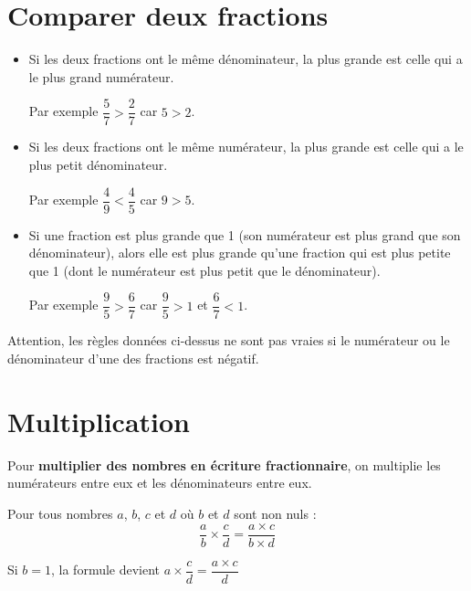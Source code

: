 \section{Comparer deux fractions}

\begin{aconnaitre}
\begin{itemize}
\item Si les deux fractions ont le même dénominateur, la plus grande est celle qui a le plus grand numérateur.

Par exemple $\dfrac{5}{7}>\dfrac{2}{7}$ car $5 > 2$.

\item Si les deux fractions ont le même numérateur, la plus grande est celle qui a le plus petit dénominateur.

Par exemple $\dfrac{4}{9}<\dfrac{4}{5}$ car $9 > 5$.

\item Si une fraction est plus grande que 1 (son numérateur est plus grand que son dénominateur), alors elle est plus grande qu'une fraction qui est plus petite que 1 (dont le numérateur est plus petit que le dénominateur).

Par exemple $\dfrac{9}{5}>\dfrac{6}{7}$ car $\dfrac{9}{5}>1$ et $\dfrac{6}{7}<1$. 
\end{itemize}
\end{aconnaitre}



\begin{remarque}
Attention, les règles données ci-dessus ne sont pas vraies si le numérateur ou le dénominateur d'une des fractions est négatif.
\end{remarque}

\section{Multiplication}

\begin{aconnaitre}
Pour \textbf{multiplier des nombres en écriture fractionnaire}, on multiplie les numérateurs entre eux et les dénominateurs entre eux.

Pour tous nombres $a$, $b$, $c$ et $d$ où $b$ et $d$ sont non nuls :
\[ \dfrac{a}{b} \times \dfrac{c}{d} = \dfrac{a\times c}{b \times d} \]
\end{aconnaitre}

\begin{remarque}
Si $b=1$, la formule devient $a \times \dfrac{c}{d} = \dfrac{a\times c}{d}$
\end{remarque}

